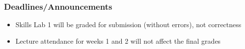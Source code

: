 
\begin{frame}
    \frametitle{Deadlines/Announcements}
\begin{itemize}
            \item Skills Lab 1 will be graded for submission (without errors), not correctness
            \item Lecture attendance for weeks 1 and 2 will not affect the final grades
        \end{itemize}
\end{frame}
